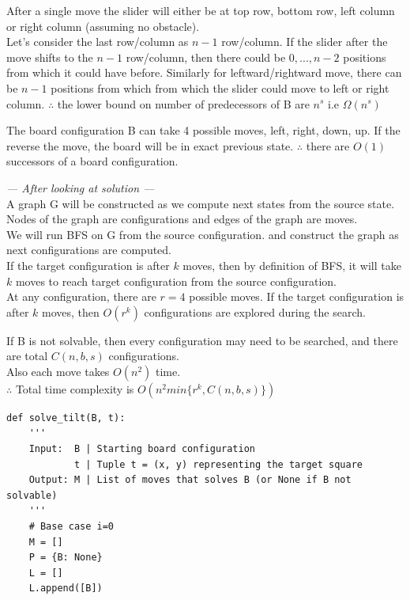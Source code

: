\documentclass[12pt,twoside]{article}
\begin{document}
\begin{problems}
\begin{problemparts}
\problempart %

After a single move the slider will either be at top row, bottom row, left column or right column (assuming no obstacle). \\
Let's consider the last row/column as $n-1$ row/column. If the slider after the move shifts to the $n-1$ row/column, then there could be $0,...,n-2$ positions from which it could have before. Similarly for leftward/rightward move, there can be $n-1$ positions from which from which the slider could move to left or right column. 
$\therefore$ the lower bound on number of predecessors of B are $n^s$ i.e $\Omega (n^s)$

The board configuration B can take 4 possible moves, left, right, down, up. If the reverse the move, the board will be in exact previous state. $\therefore$ there are $O(1)$ successors of a board configuration. 

\problempart %
\textit{--- After looking at solution ---} \\
A graph G will be constructed as we compute next states from the source state. \\

Nodes of the graph are configurations and edges of the graph are moves. \\

We will run BFS on G from the source configuration. and construct the graph as next configurations are computed. \\

If the target configuration is after $k$ moves, then by definition of BFS, it will take $k$ moves to reach target configuration from the source configuration. \\

At any configuration, there are $r=4$ possible moves. If the target configuration is after $k$ moves, then $O(r^k)$ configurations are explored during the search. 

If B is not solvable, then every configuration may need to be searched, and there are total $C(n, b, s)$ configurations. \\

Also each move takes $O(n^2)$ time. \\

$\therefore$ Total time complexity is $O(n^2 min\{r^k, C(n, b, s)\})$

\newpage
\problempart 

\begin{lstlisting}
def solve_tilt(B, t):
    '''
    Input:  B | Starting board configuration
            t | Tuple t = (x, y) representing the target square
    Output: M | List of moves that solves B (or None if B not solvable)
    '''
    # Base case i=0
    M = []
    P = {B: None}
    L = []
    L.append([B])


\end{lstlisting}
\end{problemparts}
\end{problems}
\end{document}
